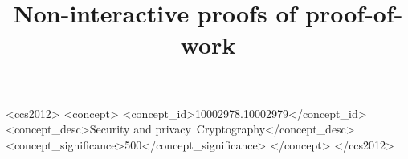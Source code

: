 \documentclass[sigconf, anonymous]{acmart}
\begin{document}
\title{Non-interactive proofs of proof-of-work}

\begin{abstract}
    
\end{abstract}

\begin{CCSXML}
    <ccs2012>
        <concept>
            <concept_id>10002978.10002979</concept_id>
            <concept_desc>Security and privacy~Cryptography</concept_desc>
            <concept_significance>500</concept_significance>
        </concept>
    </ccs2012>
\end{CCSXML}



\maketitle




% 

\end{document}
